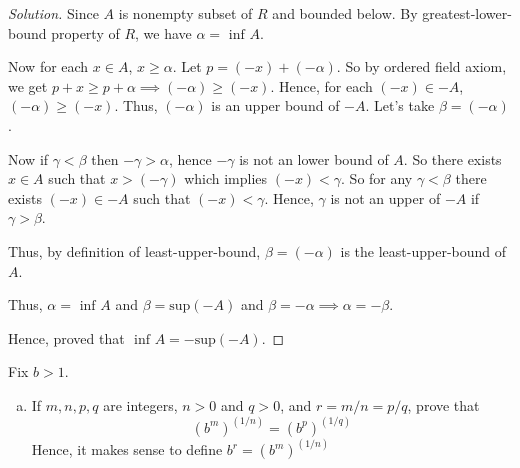 \begin{proof}[Solution]
    Since $A$ is nonempty subset of $R$ and bounded below. 
    By greatest-lower-bound property of $R$, we have $\alpha = \text{ inf } A$.

    Now for each $x \in A$, $x \geq \alpha$. Let $p = (-x) + (-\alpha)$.
    So by ordered field axiom, we get $p + x \geq p + \alpha \implies (-\alpha) \geq (-x)$.
    Hence, for each $(-x) \in -A$, $(-\alpha) \geq (-x)$. Thus, $(-\alpha)$ is an upper bound of $-A$.
    Let's take $\beta = (-\alpha)$.
    
    Now if $\gamma < \beta$ then $-\gamma > \alpha$, hence $-\gamma$ is not an lower bound of $A$.
    So there exists $x \in A$ such that $x > (-\gamma)$ which implies $(-x) < \gamma$.
    So for any $\gamma < \beta$ there exists $(-x) \in -A$ such that $(-x) < \gamma$.
    Hence, $\gamma$ is not an upper of $-A$ if $\gamma > \beta$.
    
    Thus, by definition of least-upper-bound, $\beta = (-\alpha)$ is the least-upper-bound of $A$.

    Thus, $\alpha = \text{ inf }A$ and $\beta = \text{sup}(-A)$ and $\beta = - \alpha \implies \alpha = - \beta$.
    
    Hence, proved that $\text{ inf } A = - \text{sup}(-A)$.
    
\end{proof}

\begin{prblm}
   Fix $b > 1$.
   \begin{enumerate}[(a)]
       \item If $m, n, p, q$ are integers, $n > 0$ and $q > 0$, and $r = m / n = p / q$, prove that
       $$ (b^m)^{(1/n)} = (b^p)^{(1/q)} $$
       Hence, it makes sense to define $b^r = (b^m)^{(1/n)}$
   \end{enumerate} 
\end{prblm}